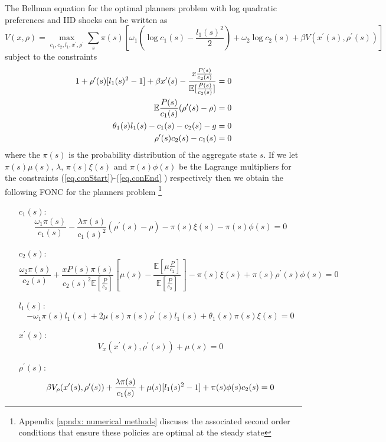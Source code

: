 \documentclass[thmsb,11pt]{article}
\begin{document}
The Bellman equation for the optimal planners problem with log quadratic
preferences and IID shocks can be written as
\begin{equation*}
V(x,\rho) = \max_{c_1,c_2,l_1,x^{\prime },\rho^{\prime }} \sum_s \pi(s)\left[%
\omega_1\left(\log c_1(s) -\frac{l_1(s)^2}{2}\right)+\omega_2\log
c_2(s)+\beta V(x^{\prime }(s),\rho^{\prime }(s))\right]
\end{equation*}%
subject to the constraints
\begin{align}
1+\rho^{\prime }(s)[l_1(s)^2-1]+\beta x^{\prime }(s) - \frac{x\frac{P(s)}{%
c_2(s)}}{\mathbb{E}[\frac{P(s)}{c_2(s)}]}=0  \label{eq.conStart} \\
\mathbb{E}\frac{P(s)}{c_1(s)}(\rho^{\prime }(s)-\rho) = 0 \\
\theta_1(s)l_1(s) -c_1(s)-c_2(s)-g = 0 \\
\rho^{\prime }(s) c_2(s)-c_1(s) = 0  \label{eq.conEnd}
\end{align}
where the $\pi(s)$ is the probability distribution of the aggregate state $s$. If
we let $\pi(s)\mu(s)$, $\lambda$, $\pi(s)\xi(s)$ and $\pi(s)\phi(s)$ be the
Lagrange multipliers for the constraints (\ref{eq.conStart})-(\ref{eq.conEnd}%
) respectively then we obtain the following FONC for the planners problem \footnote{Appendix \ref{apndx: numerical methods} discuses the associated second order conditions that ensure these policies are optimal at the steady state}

\begin{enumerate}
\item[$c_1(s):$]
\begin{equation}
\frac{\omega_1\pi(s)}{c_1(s)}-\frac{\lambda \pi(s)}{c_1(s)^2}(\rho^{\prime
}(s)-\rho)-\pi(s)\xi(s)-\pi(s)\phi(s) = 0  \label{eq.c1FOC}
\end{equation}

\item[$c_2(s):$]
\begin{equation}
\frac{\omega_2 \pi(s)}{c_2(s)} + \frac{x P(s)\pi(s)}{c_2(s)^2\mathbb{E}[\frac{P}{c_2}]}%
\left[\mu(s)-\frac{\mathbb{E}[\mu\frac{P}{c_2}]}{\mathbb{E}[\frac{P}{c_2}]}%
\right]-\pi(s)\xi(s)+\pi(s)\rho^{\prime }(s)\phi(s)=0  \label{eq.c2FOC}
\end{equation}

\item[$l_1(s):$]
\begin{equation}
-\omega_1\pi(s)l_1(s)+2\mu(s)\pi(s)\rho^{\prime
}(s)l_1(s)+\theta_1(s)\pi(s)\xi(s)=0
\end{equation}

\item[$x^{\prime }(s):$]
\begin{equation}
V_x(x^{\prime }(s),\rho^{\prime }(s)) + \mu(s) = 0
\label{eq.x'FOC}
\end{equation}

\item[$\rho^{\prime }(s):$]
\begin{equation}
 \beta V_{\rho}(x^{\prime }(s),\rho^{\prime }(s))+\frac{\lambda \pi(s)}{%
c_1(s)}+\mu(s)[l_1(s)^2-1]+\pi(s)\phi(s)c_2(s) = 0  \label{eq.FOCNend}
\end{equation}
\end{enumerate}
\end{document}
